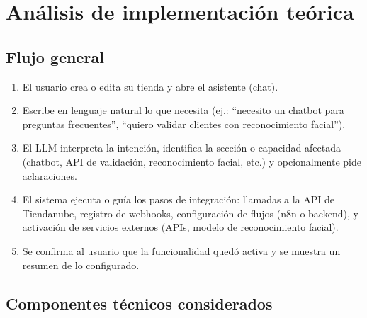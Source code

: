 \documentclass[9pt,a4paper,twocolumn,twoside]{rho-class/rho}
\begin{document}
\section{Análisis de implementación teórica}

\subsection{Flujo general}

\begin{enumerate}
    \item El usuario crea o edita su tienda y abre el asistente (chat).
    \item Escribe en lenguaje natural lo que necesita (ej.: ``necesito un chatbot para preguntas frecuentes'', ``quiero validar clientes con reconocimiento facial'').
    \item El LLM interpreta la intención, identifica la sección o capacidad afectada (chatbot, API de validación, reconocimiento facial, etc.) y opcionalmente pide aclaraciones.
    \item El sistema ejecuta o guía los pasos de integración: llamadas a la API de Tiendanube, registro de webhooks, configuración de flujos (n8n o backend), y activación de servicios externos (APIs, modelo de reconocimiento facial).
    \item Se confirma al usuario que la funcionalidad quedó activa y se muestra un resumen de lo configurado.
\end{enumerate}

\subsection{Componentes técnicos considerados}
\end{document}
